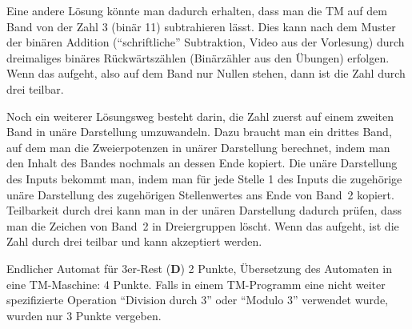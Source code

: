 \begin{loesung}
\begin{center}
\end{center}

Eine andere Lösung könnte man dadurch erhalten, dass man die TM
auf dem Band von der Zahl 3 (binär 11) subtrahieren lässt. Dies
kann nach dem Muster der binären Addition (``schriftliche'' Subtraktion,
Video aus der Vorlesung)
durch dreimaliges binäres Rückwärtszählen (Binärzähler aus den
Übungen) erfolgen.
Wenn
das aufgeht, also auf dem Band nur Nullen stehen, dann ist die
Zahl durch drei teilbar.

Noch ein weiterer Lösungsweg besteht darin, die Zahl zuerst auf einem zweiten
Band in unäre Darstellung umzuwandeln. Dazu braucht man ein drittes Band,
auf dem man die Zweierpotenzen in unärer Darstellung berechnet, indem
man den Inhalt des Bandes nochmals an dessen Ende kopiert. Die unäre
Darstellung des Inputs bekommt man, indem man für jede Stelle 1
des Inputs die zugehörige unäre Darstellung des zugehörigen Stellenwertes
ans Ende von Band~2 kopiert. Teilbarkeit durch drei kann man in der
unären Darstellung dadurch prüfen, dass man die Zeichen von Band~2
in Dreiergruppen löscht. Wenn das aufgeht, ist die Zahl durch drei teilbar
und kann akzeptiert werden.
\end{loesung}

\begin{bewertung}
Endlicher Automat für 3er-Rest ({\bf D}) 2 Punkte,
Übersetzung des Automaten in eine TM-Maschine: 4 Punkte.
Falls in einem TM-Programm eine nicht weiter spezifizierte Operation
``Division durch 3'' oder ``Modulo 3'' verwendet wurde, wurden
nur 3 Punkte vergeben.
\end{bewertung}
